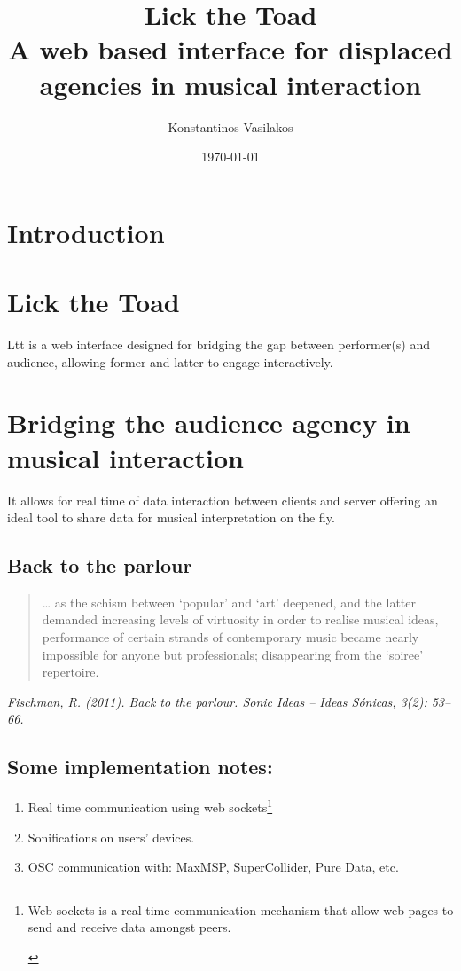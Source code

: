 \documentclass[11pt]{article}
\author{Konstantinos Vasilakos}
\date{\today}
\title{Lick the Toad\\\medskip
\large A web based interface for displaced agencies in musical interaction}
\begin{document}
\maketitle
\setcounter{tocdepth}{1}
\tableofcontents



\section*{Introduction}
\label{sec:org674f903}
\section*{Lick the Toad}
\label{sec:orgda53d64}
Ltt is a web interface designed for bridging the gap between performer(s) and audience, allowing former and latter to engage interactively.

\section*{Bridging the audience agency in musical interaction}
\label{sec:orge486533}
It allows for real time of data interaction between clients and server offering an ideal tool to share data for musical interpretation on the fly.
\subsection*{Back to the parlour}
\label{sec:orgfb38a5d}
\begin{quote}
\ldots{} as the schism between ‘popular’ and ‘art’ deepened, and
the latter demanded increasing levels of virtuosity in order
to realise musical ideas, performance of certain strands of
contemporary music became nearly impossible for anyone
but professionals; disappearing from the ‘soiree’ repertoire.
\end{quote}

\emph{Fischman, R. (2011). Back to the parlour. Sonic Ideas – Ideas Sónicas, 3(2): 53–66.}
\subsection*{Some implementation notes:}
\label{sec:org6d0662a}
\begin{enumerate}
\item Real time communication using web sockets\footnote{Web sockets is a real time communication mechanism that allow web pages to send and receive data amongst peers.

\label{bibliographystyle link}


\label{bibliography link}}
\item Sonifications on users' devices.
\item OSC communication with: MaxMSP, SuperCollider, Pure Data, etc.
\end{enumerate}
\end{document}
